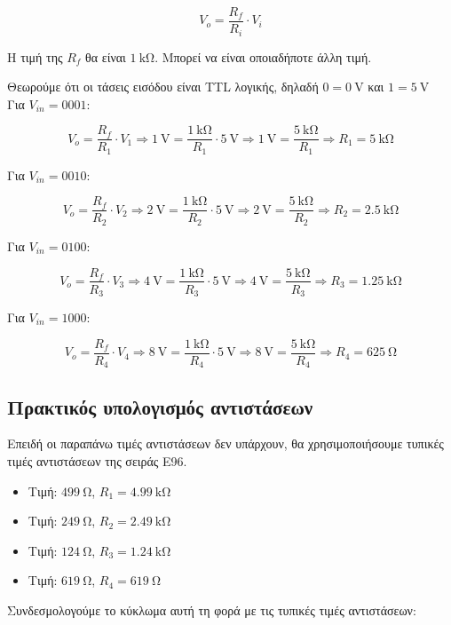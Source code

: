 \documentclass[12pt]{article}
\begin{document}
\[V_o = \frac{R_f}{R_i} \cdot V_i\]

Η τιμή της $R_f$ θα είναι $\SI{1}{\kohm}$. Μπορεί να είναι οποιαδήποτε άλλη
τιμή.

Θεωρούμε ότι οι τάσεις εισόδου είναι TTL λογικής, δηλαδή $0 = \SI{0}{\volt}$
και $1 = \SI{5}{\volt}$ \\

Για $V_{in} = 0001$:

\[V_o = \frac{R_f}{R_1} \cdot V_1 \Rightarrow
\SI{1}{\volt} = \frac{\SI{1}{\kohm}}{R_1} \cdot \SI{5}{\volt} \Rightarrow
\SI{1}{\volt} = \frac{\SI{5}{\kohm}}{R_1} \Rightarrow
R_1 = \SI{5}{\kohm}\]

Για $V_{in} = 0010$:

\[V_o = \frac{R_f}{R_2} \cdot V_2 \Rightarrow
\SI{2}{\volt} = \frac{\SI{1}{\kohm}}{R_2} \cdot \SI{5}{\volt} \Rightarrow
\SI{2}{\volt} = \frac{\SI{5}{\kohm}}{R_2} \Rightarrow
R_2 = \SI{2.5}{\kohm}\]

Για $V_{in} = 0100$:

\[V_o = \frac{R_f}{R_3} \cdot V_3 \Rightarrow
\SI{4}{\volt} = \frac{\SI{1}{\kohm}}{R_3} \cdot \SI{5}{\volt} \Rightarrow
\SI{4}{\volt} = \frac{\SI{5}{\kohm}}{R_3} \Rightarrow
R_3 = \SI{1.25}{\kohm}\]

Για $V_{in} = 1000$:

\[V_o = \frac{R_f}{R_4} \cdot V_4 \Rightarrow
\SI{8}{\volt} = \frac{\SI{1}{\kohm}}{R_4} \cdot \SI{5}{\volt} \Rightarrow
\SI{8}{\volt} = \frac{\SI{5}{\kohm}}{R_4} \Rightarrow
R_4 = \SI{625}{\ohm}\]

\subsection{Πρακτικός υπολογισμός αντιστάσεων}

Επειδή οι παραπάνω τιμές αντιστάσεων δεν υπάρχουν, θα χρησιμοποιήσουμε τυπικές
τιμές αντιστάσεων της σειράς E96.

\begin{itemize}
	\item Τιμή: $\SI{499}{\ohm}$, $R_1 = \SI{4.99}{\kohm}$
	\item Τιμή: $\SI{249}{\ohm}$, $R_2 = \SI{2.49}{\kohm}$
	\item Τιμή: $\SI{124}{\ohm}$, $R_3 = \SI{1.24}{\kohm}$
	\item Τιμή: $\SI{619}{\ohm}$, $R_4 = \SI{619}{\ohm}$
\end{itemize}

Συνδεσμολογούμε το κύκλωμα αυτή τη φορά με τις τυπικές τιμές αντιστάσεων:
\end{document}
